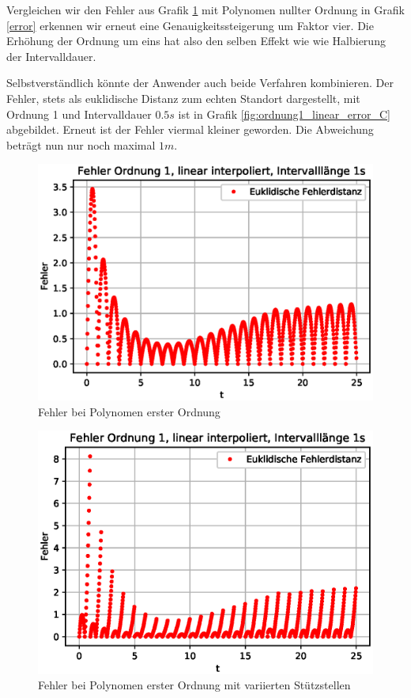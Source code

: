 Vergleichen wir den Fehler aus Grafik \ref{fig:ordnung1_linear_error_A} mit Polynomen nullter Ordnung in Grafik \ref{error} erkennen wir erneut eine Genauigkeitssteigerung um Faktor vier. Die Erhöhung der Ordnung um eins hat also den selben Effekt wie wie Halbierung der Intervalldauer.

Selbstverständlich könnte der Anwender auch beide Verfahren kombinieren. Der Fehler, stets als euklidische Distanz zum echten Standort dargestellt, mit Ordnung 1 und Intervalldauer $0.5s$ ist in Grafik \ref{fig:ordnung1_linear_error_C} abgebildet. Erneut ist der Fehler viermal kleiner geworden. Die Abweichung beträgt nun nur noch maximal $1m$.

\begin{figure}
	\centering
	\includegraphics[scale=0.7]{papers/perturbation/bilder/perturbation_fig6.eps}
	\caption{Fehler bei Polynomen erster Ordnung}
	\label{fig:ordnung1_linear_error_A}
\end{figure}

\begin{figure}
	\centering
	\includegraphics[scale=0.7]{papers/perturbation/bilder/perturbation_fig7.eps}
	\caption{Fehler bei Polynomen erster Ordnung mit variierten Stützstellen}
	\label{fig:ordnung1_linear_error_B}
\end{figure}

